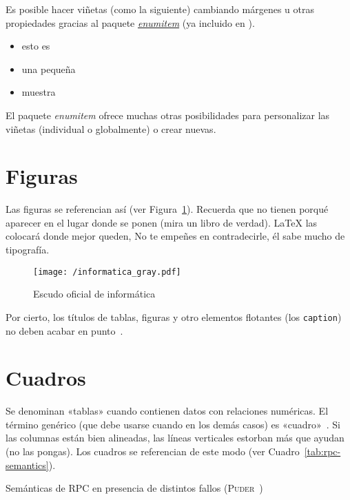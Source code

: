 Es posible hacer viñetas (como la siguiente) cambiando márgenes u otras
propiedades gracias al paquete
\href{http://mirror.ctan.org/macros/latex/contrib/enumitem/enumitem.pdf}{\emph{enumitem}}
(ya incluido en \esitfg).

\begin{itemize}[noitemsep, label=$\triangleright$]
\item esto es
\item una pequeña
\item muestra
\end{itemize}

El paquete \emph{enumitem} ofrece muchas otras posibilidades para personalizar
las viñetas (individual o globalmente) o crear nuevas.


\section{Figuras}

Las figuras se referencian así (ver Figura~\ref{fig:informatica}). Recuerda que
no tienen porqué aparecer en el lugar donde se ponen (mira un libro de
verdad). \LaTeX{} las colocará donde mejor queden, No te empeñes en
contradecirle, él sabe mucho de tipografía.

\begin{figure}[!h]
\begin{center}
\texttt{[image: /informatica\_gray.pdf]}
\caption{Escudo oficial de informática}
\label{fig:informatica}
\end{center}
\end{figure}

Por cierto, los títulos de tablas, figuras y otro elementos flotantes (los
\texttt{caption}) no deben acabar en punto~\cite{sousa}.


\section{Cuadros}
\label{sec:uncuadro}

Se denominan «tablas» cuando contienen datos con relaciones numéricas. El
término genérico (que debe usarse cuando en los demás casos) es
«cuadro»~\cite{sousa}. Si las columnas están bien alineadas, las líneas
verticales estorban más que ayudan (no las pongas). Los cuadros se referencian
de este modo (ver Cuadro~\ref{tab:rpc-semantics}).

\begin{table}[hp]
  \centering
  {\small
  
  }
  \caption[Semánticas de \acs{RPC} en presencia de distintos fallos]
  {Semánticas de \acs{RPC} en presencia de distintos fallos
    (\textsc{Puder}~\cite{puder05:_distr_system_archit})}
  \label{tab:rpc-semantics}
\end{table}


